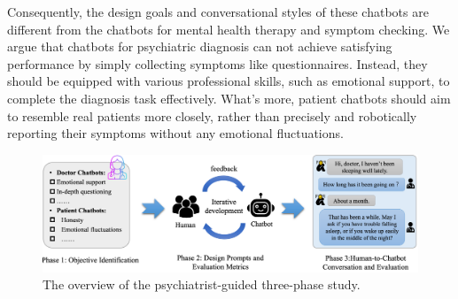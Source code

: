 Consequently, the design goals and conversational styles of these chatbots are different from the chatbots for mental health therapy and symptom checking.
We argue that chatbots for psychiatric diagnosis can not achieve satisfying performance by simply collecting symptoms like questionnaires. Instead, they should be equipped with various professional skills, such as emotional support, to complete the diagnosis task effectively.
What's more, patient chatbots should aim to resemble real patients more closely, rather than precisely and robotically reporting their symptoms without any emotional fluctuations.

\begin{figure}[th]
	\centering
	\includegraphics[width=0.8\linewidth]{Figures/overview.png}
	\caption{The overview of the psychiatrist-guided three-phase study.}
	\label{fig:pipeline}
\end{figure}



